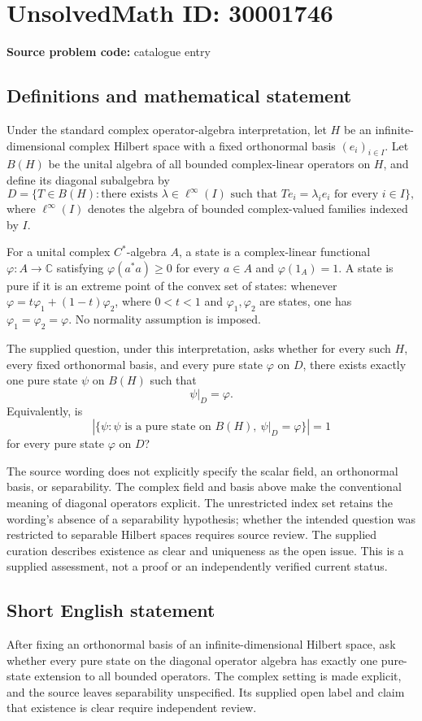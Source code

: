 \documentclass[11pt]{article}
\newcommand{\C}{\mathbb{C}}
\begin{document}
\section*{UnsolvedMath ID: 30001746}
\textbf{Source problem code:} catalogue entry
\subsection{Definitions and mathematical statement}
Under the standard complex operator-algebra interpretation, let \(H\) be an infinite-dimensional complex Hilbert space with a fixed orthonormal basis \((e_i)_{i\in I}\). Let \(B(H)\) be the unital algebra of all bounded complex-linear operators on \(H\), and define its diagonal subalgebra by
\[
D=\{T\in B(H): \text{there exists }\lambda\in\ell^\infty(I)\text{ such that }Te_i=\lambda_i e_i\text{ for every }i\in I\},
\]
where \(\ell^\infty(I)\) denotes the algebra of bounded complex-valued families indexed by \(I\).

For a unital complex \(C^*\)-algebra \(A\), a state is a complex-linear functional \(\varphi:A\to\C\) satisfying \(\varphi(a^*a)\geq 0\) for every \(a\in A\) and \(\varphi(1_A)=1\). A state is pure if it is an extreme point of the convex set of states: whenever \(\varphi=t\varphi_1+(1-t)\varphi_2\), where \(0<t<1\) and \(\varphi_1,\varphi_2\) are states, one has \(\varphi_1=\varphi_2=\varphi\). No normality assumption is imposed.

The supplied question, under this interpretation, asks whether for every such \(H\), every fixed orthonormal basis, and every pure state \(\varphi\) on \(D\), there exists exactly one pure state \(\psi\) on \(B(H)\) such that
\[
\psi|_D=\varphi.
\]
Equivalently, is
\[
\left|\{\psi:\psi\text{ is a pure state on }B(H),\ \psi|_D=\varphi\}\right|=1
\]
for every pure state \(\varphi\) on \(D\)?

The source wording does not explicitly specify the scalar field, an orthonormal basis, or separability. The complex field and basis above make the conventional meaning of diagonal operators explicit. The unrestricted index set retains the wording's absence of a separability hypothesis; whether the intended question was restricted to separable Hilbert spaces requires source review. The supplied curation describes existence as clear and uniqueness as the open issue. This is a supplied assessment, not a proof or an independently verified current status.
\subsection{Short English statement}
After fixing an orthonormal basis of an infinite-dimensional Hilbert space, ask whether every pure state on the diagonal operator algebra has exactly one pure-state extension to all bounded operators. The complex setting is made explicit, and the source leaves separability unspecified. Its supplied open label and claim that existence is clear require independent review.
\end{document}
